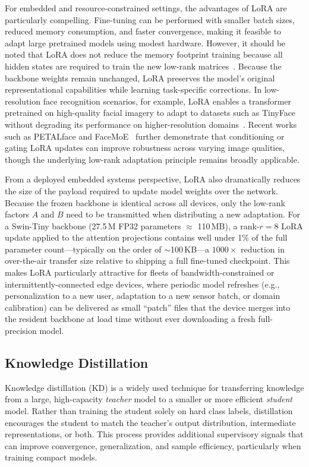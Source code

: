 \documentclass[runningheads,a4paper]{llncs}
\begin{document}
For embedded and resource-constrained settings, the advantages of LoRA are particularly compelling. Fine-tuning can be performed with smaller batch sizes, reduced memory consumption, and faster convergence, making it feasible to adapt large pretrained models using modest hardware. However, it should be noted that LoRA does not reduce the memory footprint training because all hidden states are required to train the new low-rank matrices~\cite{Wang2025HyCLoRA}. Because the backbone weights remain unchanged, LoRA preserves the model’s original representational capabilities while learning task-specific corrections. In low-resolution face recognition scenarios, for example, LoRA enables a transformer pretrained on high-quality facial imagery to adapt to datasets such as TinyFace without degrading its performance on higher-resolution domains~\cite{narayan2025petalface}. Recent works such as PETALface and FaceMoE~\cite{narayan2025petalface,narayan2024facemoe} further demonstrate that conditioning or gating LoRA updates can improve robustness across varying image qualities, though the underlying low-rank adaptation principle remains broadly applicable.

From a deployed embedded systems perspective, LoRA also dramatically reduces the size of the payload required to update model weights over the network. Because the frozen backbone is identical across all devices, only the low-rank factors $A$ and $B$ need to be transmitted when distributing a new adaptation. For a Swin-Tiny backbone (27.5\,M FP32 parameters $\approx$ 110\,MB), a rank-$r{=}8$ LoRA update applied to the attention projections contains well under 1\% of the full parameter count---typically on the order of $\sim$100\,KB---a $1000\times$ reduction in over-the-air transfer size relative to shipping a full fine-tuned checkpoint. This makes LoRA particularly attractive for fleets of bandwidth-constrained or intermittently-connected edge devices, where periodic model refreshes (e.g., personalization to a new user, adaptation to a new sensor batch, or domain calibration) can be delivered as small ``patch'' files that the device merges into the resident backbone at load time without ever downloading a fresh full-precision model.

\subsection{Knowledge Distillation}
Knowledge distillation (KD) is a widely used technique for transferring knowledge from a large, high-capacity \emph{teacher} model to a smaller or more efficient \emph{student} model. Rather than training the student solely on hard class labels, distillation encourages the student to match the teacher’s output distribution, intermediate representations, or both. This process provides additional supervisory signals that can improve convergence, generalization, and sample efficiency, particularly when training compact models.
\end{document}
